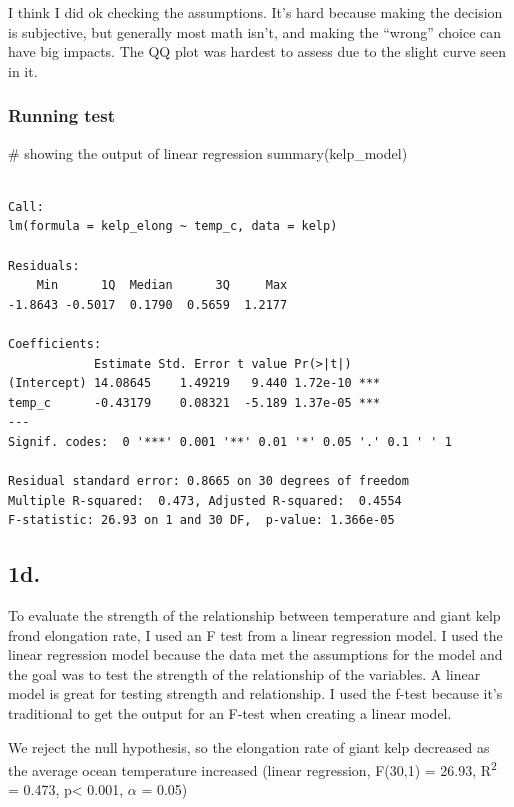 \documentclass[
  letterpaper,
  DIV=11,
  numbers=noendperiod]{scrartcl}
\newenvironment{Shaded}{\begin{snugshade}}{\end{snugshade}}
\newcommand{\CommentTok}[1]{\textcolor[rgb]{0.37,0.37,0.37}{#1}}
\newcommand{\FunctionTok}[1]{\textcolor[rgb]{0.28,0.35,0.67}{#1}}
\newcommand{\NormalTok}[1]{\textcolor[rgb]{0.00,0.23,0.31}{#1}}
\begin{document}
I think I did ok checking the assumptions. It's hard because making the
decision is subjective, but generally most math isn't, and making the
``wrong'' choice can have big impacts. The QQ plot was hardest to assess
due to the slight curve seen in it.

\subsubsection{Running test}\label{running-test}

\begin{Shaded}
\begin{Highlighting}[]
\CommentTok{\# showing the output of linear regression}
\FunctionTok{summary}\NormalTok{(kelp\_model)}
\end{Highlighting}
\end{Shaded}

\begin{verbatim}

Call:
lm(formula = kelp_elong ~ temp_c, data = kelp)

Residuals:
    Min      1Q  Median      3Q     Max 
-1.8643 -0.5017  0.1790  0.5659  1.2177 

Coefficients:
            Estimate Std. Error t value Pr(>|t|)    
(Intercept) 14.08645    1.49219   9.440 1.72e-10 ***
temp_c      -0.43179    0.08321  -5.189 1.37e-05 ***
---
Signif. codes:  0 '***' 0.001 '**' 0.01 '*' 0.05 '.' 0.1 ' ' 1

Residual standard error: 0.8665 on 30 degrees of freedom
Multiple R-squared:  0.473, Adjusted R-squared:  0.4554 
F-statistic: 26.93 on 1 and 30 DF,  p-value: 1.366e-05
\end{verbatim}

\subsection{1d.}\label{d.}

To evaluate the strength of the relationship between temperature and
giant kelp frond elongation rate, I used an F test from a linear
regression model. I used the linear regression model because the data
met the assumptions for the model and the goal was to test the strength
of the relationship of the variables. A linear model is great for
testing strength and relationship. I used the f-test because it's
traditional to get the output for an F-test when creating a linear
model.

We reject the null hypothesis, so the elongation rate of giant kelp
decreased as the average ocean temperature increased (linear regression,
F(30,1) = 26.93, R\textsuperscript{2} = 0.473, p\textless{} 0.001,
\(\alpha\) = 0.05)
\end{document}

